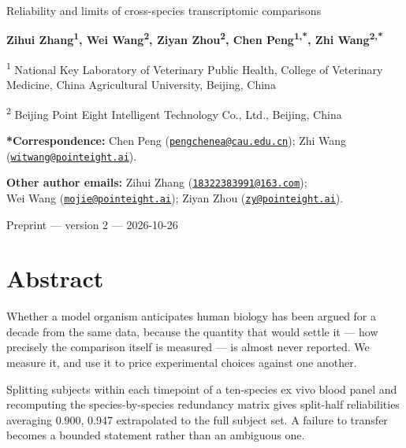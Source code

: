 \documentclass[11pt,a4paper]{article}
\begin{document}
\thispagestyle{plain}
{\fontsize{19}{22}\selectfont\bfseries\raggedright Reliability and
limits of cross-species transcriptomic comparisons\par}
\vspace{7pt}
{\fontsize{11.5}{14}\selectfont \textbf{Zihui Zhang\textsuperscript{1},
Wei Wang\textsuperscript{2}, Ziyan Zhou\textsuperscript{2}, Chen
Peng\textsuperscript{1,*}, Zhi Wang\textsuperscript{2,*}}\par}
\vspace{4pt}
{\fontsize{9.5}{11.8}\selectfont{}\setlength{\parskip}{3pt}
\raggedright{}
\textsuperscript{1} National Key Laboratory of Veterinary Public Health,
College of Veterinary Medicine, China Agricultural University, Beijing,
China

\textsuperscript{2} Beijing Point Eight Intelligent Technology Co.,
Ltd., Beijing, China

\textbf{*Correspondence:} Chen Peng
(\href{mailto:pengchenea@cau.edu.cn}{\nolinkurl{pengchenea@cau.edu.cn}});
Zhi Wang
(\href{mailto:witwang@pointeight.ai}{\nolinkurl{witwang@pointeight.ai}}).

\textbf{Other author emails:} Zihui Zhang
(\href{mailto:18322383991@163.com}{\nolinkurl{18322383991@163.com}});\\
Wei Wang
(\href{mailto:mojie@pointeight.ai}{\nolinkurl{mojie@pointeight.ai}});
Ziyan Zhou
(\href{mailto:zy@pointeight.ai}{\nolinkurl{zy@pointeight.ai}}).
\par}
\vspace{5pt}
{\small Preprint --- version 2 --- 2026-10-26\par}
\vspace{11pt}
\section*{Abstract}
\begingroup
\fontsize{10.5}{12.8}\selectfont

Whether a model organism anticipates human biology has been argued for a
decade from the same data, because the quantity that would settle it ---
how precisely the comparison itself is measured --- is almost never
reported. We measure it, and use it to price experimental choices
against one another.

Splitting subjects within each timepoint of a ten-species ex vivo blood
panel and recomputing the species-by-species redundancy matrix gives
split-half reliabilities averaging 0.900, 0.947 extrapolated to the full
subject set. A failure to transfer becomes a bounded statement rather
than an ambiguous one.
\end{document}
